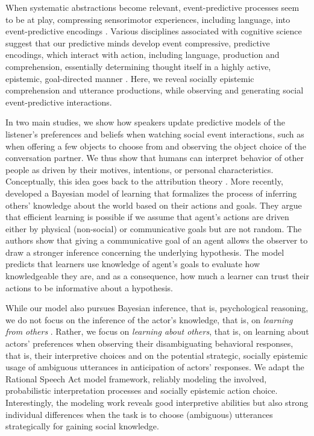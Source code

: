 \documentclass[10pt,a4paper]{article}
\begin{document}
When systematic abstractions become relevant, event-predictive processes seem to be at play, compressing sensorimotor experiences, including language, into event-predictive encodings \cite{Butz:2016,Butz:2017a}.
Various disciplines associated with cognitive science suggest that our predictive minds develop event compressive, predictive encodings, which interact with action, including language, production and comprehension, essentially determining thought itself in a highly active, epistemic, goal-directed manner  \cite{Baldwin:2019tsi,DuBrow:2019tsi,Elsner:2019tsi,Fallgatter:2019tsi,Knott:2019tsi,Papafragou:2019tsi,Zacks:2019tsi}.
Here, we reveal socially epistemic comprehension and utterance productions, while observing and generating social event-predictive interactions.


In two main studies, we show how speakers update predictive models of the listener's preferences and beliefs when watching social event interactions, such as when offering a few objects to choose from and observing the object choice of the conversation partner. 
We thus show that humans can interpret behavior of other people as driven by their motives, intentions, or personal characteristics.
Conceptually, this idea goes back to the attribution theory \cite{jones1965acts, kelley1967attribution, kelley1970social}.
More recently,  developed a Bayesian model of learning that formalizes the process of inferring others' knowledge about the world based on their actions and goals. They argue that efficient learning is possible if we assume that agent's actions are driven either by physical (non-social) or communicative goals but are not random. The authors show that giving a communicative goal of an agent allows the observer to draw a stronger inference concerning the underlying hypothesis.
The model predicts that learners use knowledge of agent's goals to evaluate how knowledgeable they are, and as a consequence, how much a learner can trust their actions to be informative about a hypothesis.
 

While our model also pursues Bayesian inference, that is, psychological reasoning,   
we do not focus on the inference of the actor's knowledge, that is, on \emph{learning from others} \cite{shafto2012learning}.
Rather, we focus on \emph{learning about others}, that is, on learning about actors' preferences when observing their disambiguating behavioral responses, that is, their interpretive choices
and on the potential strategic, socially epistemic usage of ambiguous utterances in anticipation of actors' responses. 
We adapt the Rational Speech Act model framework, reliably modeling the involved, probabilistic interpretation processes and socially epistemic action choice. 
Interestingly, the modeling work reveals good interpretive abilities but also strong individual differences when the task is to choose (ambiguous) utterances strategically for gaining social knowledge. 
\end{document}
